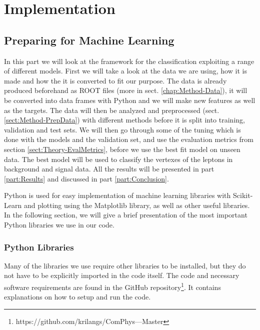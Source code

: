 \documentclass[a4paper, american, 12pt]{report}
\begin{document}

	\part{Implementation}
	\label{part:Implementation}
	
	\chapter{Preparing for Machine Learning}
	\label{chap:Method-Methods}
	In this part we will look at the framework for the classification exploiting a range of different models. First we will take a look at the data we are using, how it is made and how the it is converted to fit our purpose. The data is already produced beforehand as ROOT files (more in sect. \ref{chap:Method-Data}), it will be converted into data frames with Python and we will make new features as well as the targets. The data will then be analyzed and preprocessed (sect. \ref{sect:Method-PrepData}) with different methods before it is split into training, validation and test sets. We will then go through some of the tuning which is done with the models and the validation set, and use the evaluation metrics from section \ref{sect:Theory-EvalMetrics}, before we use the best fit model on unseen data. The best model will be used to classify the vertexes of the leptons in background and signal data. All the results will be presented in part \ref{part:Results} and discussed in part \ref{part:Conclusion}.
	
	Python is used for easy implementation of machine learning libraries with Scikit-Learn and plotting using the Matplotlib library, as well as other useful libraries. In the following section, we will give a brief presentation of the most important Python libraries we use in our code.
	
	
	\section{Python Libraries}
	\label{sect:Method-Packages}
	Many of the libraries we use require other libraries to be installed, but they do not have to be explicitly imported in the code itself. The code and necessary software requirements are found in the GitHub repository\footnote{https://github.com/krilangs/ComPhys---Master}. It contains explanations on how to setup and run the code.
	
\end{document}
